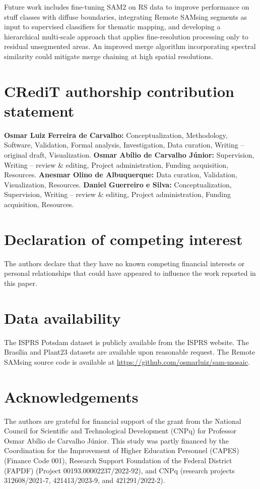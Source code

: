 \documentclass[review,11pt,authoryear]{elsarticle}
\begin{document}
Future work includes fine-tuning SAM2 on RS data to improve performance on stuff classes with diffuse boundaries, integrating Remote SAMsing segments as input to supervised classifiers for thematic mapping, and developing a hierarchical multi-scale approach that applies fine-resolution processing only to residual unsegmented areas. An improved merge algorithm incorporating spectral similarity could mitigate merge chaining at high spatial resolutions.


\section*{CRediT authorship contribution statement}
\textbf{Osmar Luiz Ferreira de Carvalho:} Conceptualization, Methodology, Software, Validation, Formal analysis, Investigation, Data curation, Writing -- original draft, Visualization. \textbf{Osmar Ab\'{i}lio de Carvalho J\'{u}nior:} Supervision, Writing -- review \& editing, Project administration, Funding acquisition, Resources. \textbf{Anesmar Olino de Albuquerque:} Data curation, Validation, Visualization, Resources. \textbf{Daniel Guerreiro e Silva:} Conceptualization, Supervision, Writing -- review \& editing, Project administration, Funding acquisition, Resources.

\section*{Declaration of competing interest}
The authors declare that they have no known competing financial interests or personal relationships that could have appeared to influence the work reported in this paper.

\section*{Data availability}
The ISPRS Potsdam dataset is publicly available from the ISPRS website. The Bras\'{i}lia and Plant23 datasets are available upon reasonable request. The Remote SAMsing source code is available at \url{https://github.com/osmarluiz/sam-mosaic}.

\section*{Acknowledgements}
The authors are grateful for financial support of the grant from the National Council for Scientific and Technological Development (CNPq) for Professor Osmar Ab\'{i}lio de Carvalho J\'{u}nior. This study was partly financed by the Coordination for the Improvement of Higher Education Personnel (CAPES) (Finance Code 001), Research Support Foundation of the Federal District (FAPDF) (Project 00193.00002237/2022-92), and CNPq (research projects 312608/2021-7, 421413/2023-9, and 421291/2022-2).



\end{document}

